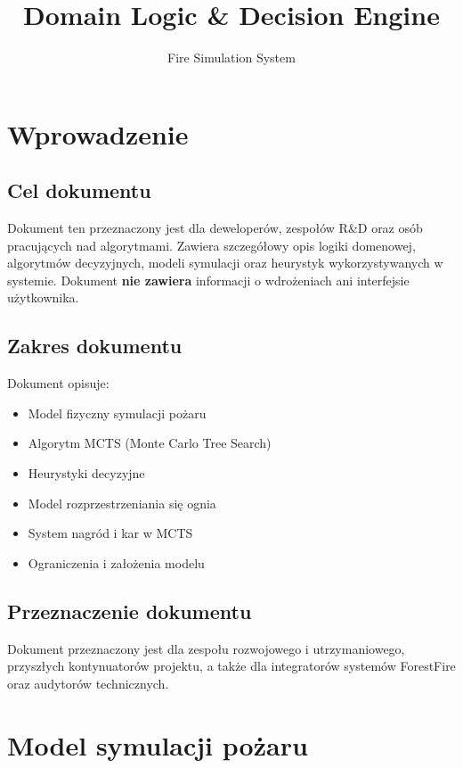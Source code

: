 \documentclass[11pt,a4paper]{article}
\title{Domain Logic \& Decision Engine}
\author{Fire Simulation System}
\begin{document}
\maketitle
\tableofcontents
\newpage

\section{Wprowadzenie}

\subsection{Cel dokumentu}

Dokument ten przeznaczony jest dla deweloperów, zespołów R\&D oraz osób pracujących nad algorytmami. Zawiera szczegółowy opis logiki domenowej, algorytmów decyzyjnych, modeli symulacji oraz heurystyk wykorzystywanych w systemie. Dokument \textbf{nie zawiera} informacji o wdrożeniach ani interfejsie użytkownika.

\subsection{Zakres dokumentu}

Dokument opisuje:
\begin{itemize}
    \item Model fizyczny symulacji pożaru
    \item Algorytm MCTS (Monte Carlo Tree Search)
    \item Heurystyki decyzyjne
    \item Model rozprzestrzeniania się ognia
    \item System nagród i kar w MCTS
    \item Ograniczenia i założenia modelu
\end{itemize}


\subsection{Przeznaczenie dokumentu}

Dokument przeznaczony jest dla zespołu rozwojowego i utrzymaniowego, przyszłych kontynuatorów projektu, a także dla integratorów systemów ForestFire oraz audytorów technicznych.




\section{Model symulacji pożaru}
\end{document}
